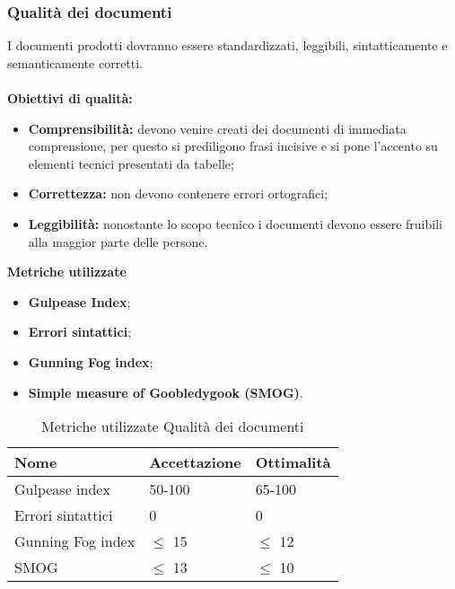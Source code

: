 \subsubsection{Qualità dei documenti}
I documenti prodotti dovranno essere standardizzati, leggibili, sintatticamente e semanticamente corretti.\\\\
\textbf{Obiettivi di qualità:}
\begin{itemize}
	\item{\textbf{Comprensibilità:} devono venire creati dei documenti di immediata comprensione, per questo si prediligono frasi incisive e si pone l'accento su elementi tecnici presentati da tabelle;}
	\item\textbf{Correttezza:} non devono contenere errori ortografici;
	\item\textbf{Leggibilità:} nonostante lo scopo tecnico i documenti devono essere fruibili alla maggior parte delle persone.\\
\end{itemize}
\textbf{Metriche utilizzate}
\begin{itemize}
	\item{\textbf{Gulpease Index\pedice};}
	\item{\textbf{Errori sintattici};}
	\item{\textbf{Gunning Fog index\pedice};}
	\item{\textbf{Simple measure of Goobledygook (SMOG)\pedice}.}
\end{itemize}
\begin{table}[!htpb]
	\centering
	\renewcommand{\arraystretch}{2} 
		\begin{tabular}{|l|l|l|}
			\rowcolor{orange!50}
			\hline
			\textbf{Nome} & \textbf{Accettazione} & \textbf{Ottimalità} \\ \hline
			Gulpease index    &   50-100   &    65-100       \\ \hline
			Errori sintattici     &  0    &   0      \\ \hline
			Gunning Fog index    &     $\leq$ 15      &   $\leq$ 12   \\ \hline
			SMOG                  &               $\leq$ 13                                &                          $\leq$ 10                   \\ \hline
		\end{tabular}
	\caption{Metriche utilizzate Qualità dei documenti}
\end{table}
\newpage
